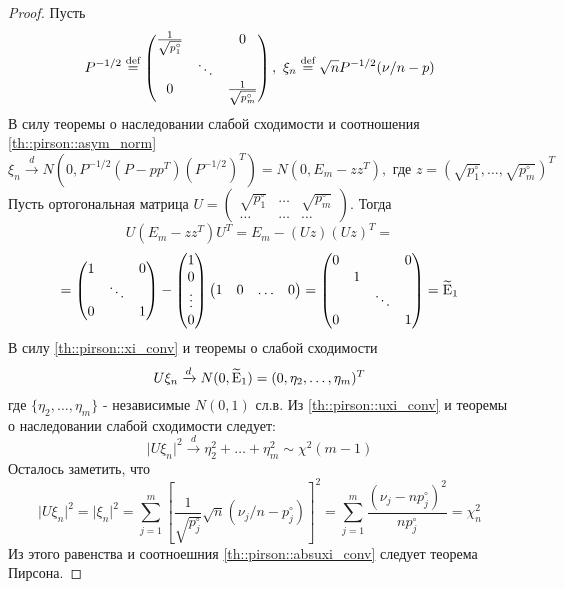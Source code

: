 \begin{proof}
    Пусть
    \[P^{-1/2}\stackrel{\text{def}}{=}\begin{pmatrix}
        \frac{1}{\sqrt{p_1^\circ}} & & 0 \\
            & \ddots & \\
        0 & & \frac{1}{\sqrt{p_m^\circ}}
    \end{pmatrix},\
    \xi_n\stackrel{\text{def}}{=}\sqrt{n}P^{-1/2}(\nu/n-p)
    \]
    В силу теоремы о наследовании слабой сходимости и соотношения \eqref{th::pirson::asym_norm}
    \begin{equation} \label{th::pirson::xi_conv}
        \xi_n\xrightarrow{d}N(0, P^{-1/2}(P-pp^T)(P^{-1/2})^T)=N(0, E_m-zz^T),\text{ где } z=(\sqrt{p_1^\circ},\ldots,\sqrt{p_m^\circ})^T
    \end{equation}
    Пусть ортогональная матрица $U=\begin{pmatrix}
        \sqrt{p_1^\circ} & \ldots & \sqrt{p_m^\circ} \\
        \ldots & \ldots & \ldots
    \end{pmatrix}$. Тогда
    \[U(E_m-zz^T)U^T=E_m-(Uz)(Uz)^T=\]
    \[=\begin{pmatrix}
        1 &        & 0 \\
            & \ddots &   \\
        0 &        & 1 \\
    \end{pmatrix}-\begin{pmatrix}
        1 \\ 0 \\ \vdots \\ 0
    \end{pmatrix}\begin{pmatrix}
        1  & 0  & \ldots  & 0
    \end{pmatrix}=\begin{pmatrix}
        0 &   &        & 0 \\
            & 1 &        &   \\
            &   & \ddots &   \\
        0 &   &        & 1 \\
    \end{pmatrix}=\widetilde{\mathrm{E}}_1\]
    В силу \eqref{th::pirson::xi_conv} и теоремы о слабой сходимости
    \begin{equation} \label{th::pirson::uxi_conv}
        U\xi_n\xrightarrow{d}N(0,\widetilde{\mathrm{E}}_1) = (0,\eta_2,\ldots,\eta_m)^T
    \end{equation}
    где $\{\eta_2,\ldots,\eta_m\}$ - независимые $N(0,1)$ сл.в. Из \eqref{th::pirson::uxi_conv}
    и теоремы о наследовании слабой сходимости следует:
    \begin{equation}\label{th::pirson::absuxi_conv}
        \lvert U\xi_n\rvert^2\xrightarrow{d} \eta_2^2+\ldots+\eta_m^2\sim\chi^2(m-1)
    \end{equation}
    Осталось заметить, что
    \[\lvert U\xi_n\rvert^2=\lvert\xi_n\rvert^2=\sum_{j=1}^m\left[\frac{1}{\sqrt{p_j^\circ}}\sqrt{n}(\nu_j/n-p_j^\circ)\right]^2=\sum_{j=1}^m\frac{(\nu_j-np_j^\circ)^2}{np_j^\circ}=\chi_n^2\]
    Из этого равенства и соотноешния \eqref{th::pirson::absuxi_conv} следует теорема Пирсона.
\end{proof}

